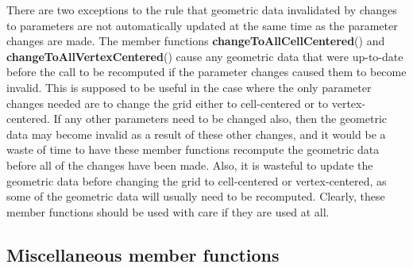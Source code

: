 \documentclass{article}
\begin{document}

There are two exceptions to the rule that geometric data invalidated by changes to parameters are not automatically updated
at the same time as the parameter changes are made.  The member functions \textbf{changeToAllCellCentered}() and
\textbf{changeToAllVertexCentered}() cause any geometric data that were up-to-date before the call to be recomputed if
the parameter changes caused them to become invalid.  This is supposed to be useful in the case where the only parameter
changes needed are to change the grid either to cell-centered or to vertex-centered.  If any other parameters need to be
changed also, then the geometric data may become invalid as a result of these other changes, and it would be a waste of
time to have these member functions recompute the geometric data before all of the changes have been made.  Also, it is
wasteful to update the geometric data before changing the grid to cell-centered or vertex-centered, as some of the
geometric data will usually need to be recomputed.  Clearly, these member functions should be used with care if they are
used at all.

\subsection{Miscellaneous member functions}
\label{MappedGrid:Miscellaneous}
\end{document}
